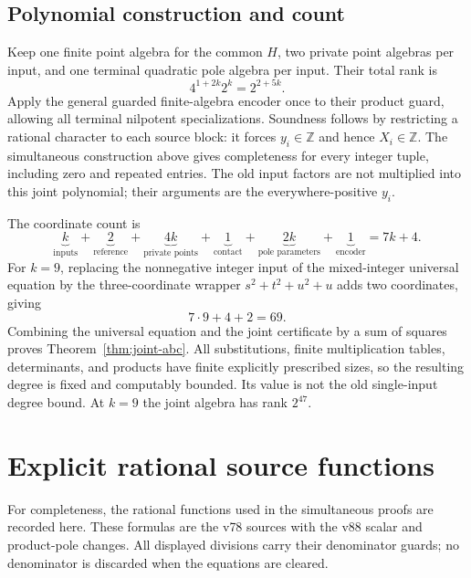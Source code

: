 \documentclass[11pt]{article}
\begin{document}
\subsection{Polynomial construction and count}

Keep one finite point algebra for the common $H$, two private point
algebras per input, and one terminal quadratic pole algebra per
input.  Their total rank is
\[
                         4^{1+2k}2^k=2^{2+5k}.
\]
Apply the general guarded finite-algebra encoder once to their
product guard, allowing all terminal nilpotent specializations.
Soundness follows by restricting a rational character to each
source block: it forces $y_i\in\mathbb Z$ and hence
$X_i\in\mathbb Z$.  The simultaneous construction above gives
completeness for every integer tuple, including zero and repeated
entries.  The old input factors are not multiplied into this joint
polynomial; their arguments are the everywhere-positive $y_i$.

The coordinate count is
\[
 \underbrace{k}_{\text{inputs}}+
 \underbrace{2}_{\text{reference}}+
 \underbrace{4k}_{\text{private points}}+
 \underbrace{1}_{\text{contact}}+
 \underbrace{2k}_{\text{pole parameters}}+
 \underbrace{1}_{\text{encoder}}=7k+4.
\]
For $k=9$, replacing the nonnegative integer input of the
mixed-integer universal equation by the three-coordinate wrapper
$s^2+t^2+u^2+u$ adds two coordinates, giving
\[
                              7\cdot9+4+2=69.
\]
Combining the universal equation and the joint certificate by a
sum of squares proves Theorem~\ref{thm:joint-abc}.  All substitutions,
finite multiplication tables, determinants, and products have
finite explicitly prescribed sizes, so the resulting degree is
fixed and computably bounded.  Its value is not the old single-input
degree bound.  At $k=9$ the joint algebra has rank $2^{47}$.

\section{Explicit rational source functions}
\label{sec:shared-source-functions}

For completeness, the rational functions used in the simultaneous
proofs are recorded here.  These formulas are the v78 sources with
the v88 scalar and product-pole changes.  All displayed divisions
carry their denominator guards; no denominator is discarded when
the equations are cleared.
\end{document}
